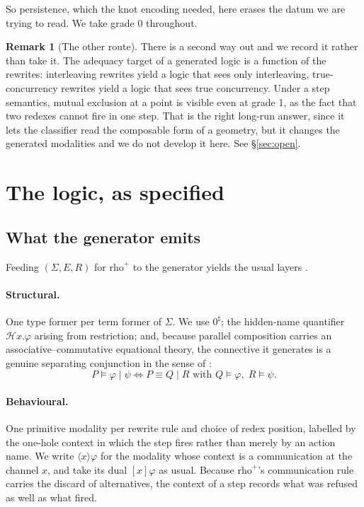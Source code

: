 \documentclass[11pt]{article}
\theoremstyle{plain}
\theoremstyle{definition}
\newtheorem{remark}[theorem]{Remark}
\newcommand{\rhoplus}{\mathrm{rho}^{+}}
\newcommand{\bmid}{\mathbin{|}}
\begin{document}
So persistence, which the knot encoding needed, here erases the datum we are trying to read. We
take grade 0 throughout.

\begin{remark}[The other route]
There is a second way out and we record it rather than take it. The adequacy target of a generated
logic is a function of the rewrites: interleaving rewrites yield a logic that sees only
interleaving, true-concurrency rewrites yield a logic that sees true concurrency. Under a step
semantics, mutual exclusion at a point is visible even at grade 1, as the fact that two redexes
cannot fire in one step. That is the right long-run answer, since it lets the classifier read the
composable form of a geometry, but it changes the generated modalities and we do not develop it
here. See \S\ref{sec:open}.
\end{remark}

\section{The logic, as specified}

\subsection{What the generator emits}

Feeding $(\Sigma,E,R)$ for $\rhoplus$ to the generator yields the usual layers \cite{OSLF,Zeus}.

\paragraph{Structural.}
One type former per term former of $\Sigma$. We use $0^\sharp$; the hidden-name quantifier
$\mathcal{H}x.\varphi$ arising from restriction; and, because parallel composition carries an
associative--commutative equational theory, the connective it generates is a genuine separating
conjunction in the sense of \cite{CairesCardelli,Reynolds}:
\[
P \models \varphi \bmid \psi \iff P \equiv Q \bmid R \text{ with } Q \models \varphi,\; R \models \psi.
\]

\paragraph{Behavioural.}
One primitive modality per rewrite rule and choice of redex position, labelled by the one-hole
context in which the step fires rather than merely by an action name. We write $\langle x \rangle
\varphi$ for the modality whose context is a communication at the channel $x$, and take its dual
$[x]\varphi$ as usual. Because $\rhoplus$'s communication rule carries the discard of alternatives,
the context of a step records what was refused as well as what fired.
\end{document}
